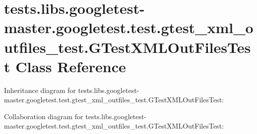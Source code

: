 \hypertarget{classtests_1_1libs_1_1googletest-master_1_1googletest_1_1test_1_1gtest__xml__outfiles__test_1_1GTestXMLOutFilesTest}{}\section{tests.\+libs.\+googletest-\/master.googletest.\+test.\+gtest\+\_\+xml\+\_\+outfiles\+\_\+test.\+G\+Test\+X\+M\+L\+Out\+Files\+Test Class Reference}
\label{classtests_1_1libs_1_1googletest-master_1_1googletest_1_1test_1_1gtest__xml__outfiles__test_1_1GTestXMLOutFilesTest}


Inheritance diagram for tests.\+libs.\+googletest-\/master.googletest.\+test.\+gtest\+\_\+xml\+\_\+outfiles\+\_\+test.\+G\+Test\+X\+M\+L\+Out\+Files\+Test\+:


Collaboration diagram for tests.\+libs.\+googletest-\/master.googletest.\+test.\+gtest\+\_\+xml\+\_\+outfiles\+\_\+test.\+G\+Test\+X\+M\+L\+Out\+Files\+Test\+:

